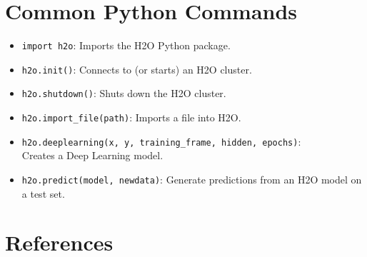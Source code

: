 {{{\section{Common Python Commands}
\begin{itemize}
\item \texttt{import h2o}:  Imports the H2O Python package.

\item \texttt{h2o.init()}:  Connects to (or starts) an H2O cluster.

\item \texttt{h2o.shutdown()}: Shuts down the H2O cluster.

\item \texttt{h2o.import\_file(path)}: Imports a file into H2O.

\item \texttt{h2o.deeplearning(x, y, training\_frame, hidden, epochs)}: \\ Creates a Deep Learning model.


\item \texttt{h2o.predict(model, newdata)}: Generate predictions from an H2O model on a test set.

\end{itemize}

\newpage

\section{References}

  









}}}

